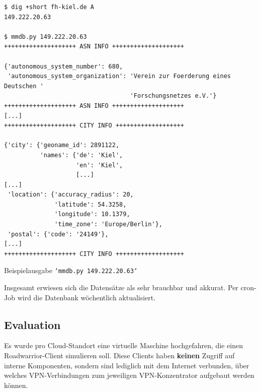 \begin{listing}[h]
\begin{verbatim}
$ dig +short fh-kiel.de A
149.222.20.63

$ mmdb.py 149.222.20.63
++++++++++++++++++++ ASN INFO ++++++++++++++++++++

{'autonomous_system_number': 680,
 'autonomous_system_organization': 'Verein zur Foerderung eines Deutschen '
                                   'Forschungsnetzes e.V.'}
++++++++++++++++++++ ASN INFO ++++++++++++++++++++
[...]
++++++++++++++++++++ CITY INFO +++++++++++++++++++

{'city': {'geoname_id': 2891122,
          'names': {'de': 'Kiel',
                    'en': 'Kiel',
                    [...]
[...]
 'location': {'accuracy_radius': 20,
              'latitude': 54.3258,
              'longitude': 10.1379,
              'time_zone': 'Europe/Berlin'},
 'postal': {'code': '24149'},
[...]
++++++++++++++++++++ CITY INFO +++++++++++++++++++
\end{verbatim}
\caption{Beispielausgabe \texttt{`mmdb.py 149.222.20.63`}}
\label{mmdb-example}
\end{listing}\FloatBarrier
Insgesamt erwiesen sich die Datensätze als sehr brauchbar und akkurat. Per cron-Job wird die Datenbank wöchentlich aktualisiert.

\subsection{Evaluation}


Es wurde pro Cloud-Standort eine virtuelle Maschine hochgefahren, die einen Roadwarrior-Client simulieren soll. Diese Clients haben \textbf{keinen} Zugriff auf interne Komponenten, sondern sind lediglich mit dem Internet verbunden, über welches VPN-Verbindungen zum jeweiligen VPN-Konzentrator aufgebaut werden können.

